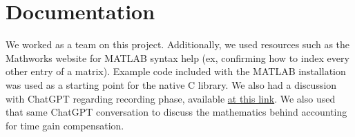 \section*{Documentation}
We worked as a team on this project. Additionally, we used resources such as the Mathworks website for \textsc{MATLAB} 
syntax help (ex, confirming how to index every other entry of a matrix). Example code included with the MATLAB 
installation was used as a starting point for the native C library. We also had a discussion with ChatGPT regarding 
recording phase, available \href{https://chatgpt.com/c/673ff615-bf94-800b-a437-6f861b769c24}{at this link}. 
We also used that same ChatGPT conversation to discuss the mathematics behind accounting for time gain compensation.